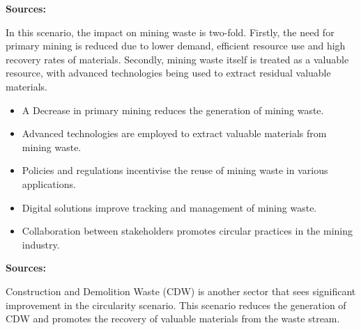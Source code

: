 \wasteSubsubsecMIN 
\textbf{Sources:}


In this scenario, the impact on mining waste is two-fold. Firstly, the need for primary mining is reduced due to lower demand, efficient resource use and high recovery rates of materials. Secondly, mining waste itself is treated as a valuable resource, with advanced technologies being used to extract residual valuable materials.

\begin{itemize}
  \item A Decrease in primary mining reduces the generation of mining waste.
  \item Advanced technologies are employed to extract valuable materials from mining waste.
  \item Policies and regulations incentivise the reuse of mining waste in various applications.
  \item Digital solutions improve tracking and management of mining waste.
  \item Collaboration between stakeholders promotes circular practices in the mining industry.
\end{itemize}


\wasteSubsubsecCDW 
\textbf{Sources:}~\cite{eu2008wastedirective}

Construction and Demolition Waste (CDW) is another sector that sees significant improvement in the circularity scenario. This scenario reduces the generation of CDW and promotes the recovery of valuable materials from the waste stream.


